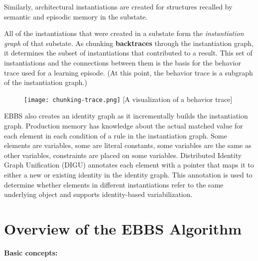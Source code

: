 Similarly, architectural instantiations are created for structures recalled by semantic and episodic memory in the substate.

All of the instantiations that were created in a substate form the \textit{instantiation graph} of that substate.  As chunking \textbf{backtraces} through the instantiation graph, it determines the subset of instantiations that contributed to a result.  This set of instantiations and the connections between them is the basis for the behavior trace used for a learning episode. (At this point, the behavior trace is a subgraph of the instantiation graph.)

\begin{figure}[!h]
	\centering
	\texttt{[image: chunking-trace.png]}
	[A visualization of a behavior trace]
	\label{fig:chunking-trace}
\end{figure}

EBBS also creates an identity graph as it incrementally builds the instantiation graph. Production memory has knowledge about the actual matched value for each element in each condition of a rule in the instantiation graph. Some elements are variables, some are literal constants, some variables are the same as other variables, constraints are placed on some variables. Distributed Identity Graph Unification (DIGU) annotates each element with a pointer that maps it to either a new or existing identity in the identity graph. This annotation is used to determine whether elements in different instantiations refer to the same underlying object and supports identity-based variabilization.

\section{Overview of the EBBS Algorithm}
\label{CHUNKING-ebbs}

\textbf{Basic concepts:}

